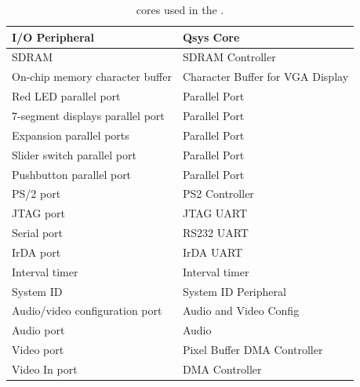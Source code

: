 
\begin{table}[h]
    \begin{center}
    \begin{tabular}{l|l}
            \textbf{I/O Peripheral}
            & \textbf{Qsys Core}
        \\\hline
            \rule{0in}{0.2in}SDRAM
            & SDRAM Controller
        \\
            On-chip memory character buffer
				& Character Buffer for VGA Display
        \\
            Red LED parallel port
				& Parallel Port
        \\
            7-segment displays parallel port
				& Parallel Port
        \\
            Expansion parallel ports
				& Parallel Port
        \\
            Slider switch parallel port
				& Parallel Port
        \\
            Pushbutton parallel port
				& Parallel Port
        \\
            PS/2 port
				& PS2 Controller
        \\
            JTAG port
				& JTAG UART
        \\
            Serial port
				& RS232 UART
        \\
            IrDA port
				& IrDA UART
        \\
            Interval timer
				& Interval timer 
        \\
            System ID
				& System ID Peripheral
        \\
            Audio/video configuration port
				& Audio and Video Config
        \\
            Audio port
				& Audio
        \\
            Video port
				& Pixel Buffer DMA Controller
        \\
            Video In port
				& DMA Controller
        \\
    \end{tabular}
    \caption{{\systemBuilder} cores used in the {\it \systemNameFull}.}
    \label{tab:sopcnames}
    \end{center}
\end{table}
\clearpage



